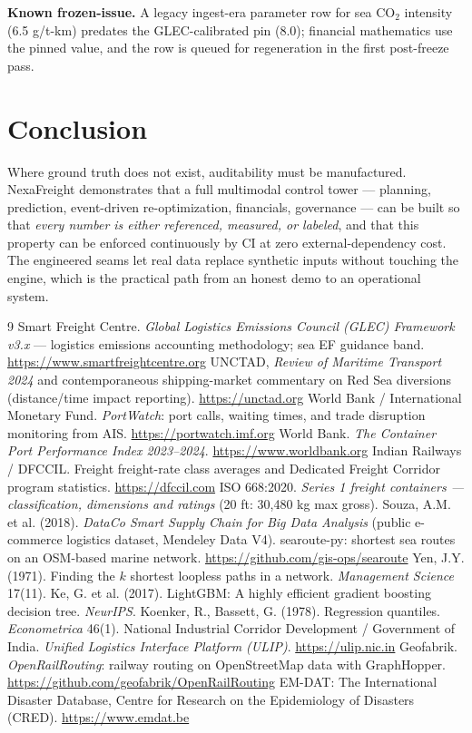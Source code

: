 \documentclass[11pt]{article}
\begin{document}
\textbf{Known frozen-issue.} A legacy ingest-era parameter row for sea
CO$_2$ intensity (6.5 g/t-km) predates the GLEC-calibrated pin (8.0);
financial mathematics use the pinned value, and the row is queued for
regeneration in the first post-freeze pass.

\section{Conclusion}

Where ground truth does not exist, auditability must be manufactured.
NexaFreight demonstrates that a full multimodal control tower ---
planning, prediction, event-driven re-optimization, financials,
governance --- can be built so that \emph{every number is either
referenced, measured, or labeled}, and that this property can be
enforced continuously by CI at zero external-dependency cost. The
engineered seams let real data replace synthetic inputs without
touching the engine, which is the practical path from an honest demo to
an operational system.

\begin{thebibliography}{9}
 Smart Freight Centre. \emph{Global Logistics Emissions
Council (GLEC) Framework v3.x} --- logistics emissions accounting
methodology; sea EF guidance band. \url{https://www.smartfreightcentre.org}
 UNCTAD, \emph{Review of Maritime Transport 2024} and
contemporaneous shipping-market commentary on Red Sea diversions
(distance/time impact reporting). \url{https://unctad.org}
 World Bank / International Monetary Fund.
\emph{PortWatch}: port calls, waiting times, and trade disruption
monitoring from AIS. \url{https://portwatch.imf.org}
 World Bank. \emph{The Container Port Performance Index
2023--2024}. \url{https://www.worldbank.org}
 Indian Railways / DFCCIL. Freight freight-rate class
averages and Dedicated Freight Corridor program statistics.
\url{https://dfccil.com}
 ISO 668:2020. \emph{Series 1 freight containers ---
classification, dimensions and ratings} (20 ft: 30{,}480 kg max gross).
 Souza, A.M. et al. (2018). \emph{DataCo Smart Supply
Chain for Big Data Analysis} (public e-commerce logistics dataset,
Mendeley Data V4).
 searoute-py: shortest sea routes on an OSM-based
marine network. \url{https://github.com/gis-ops/searoute}
 Yen, J.Y. (1971). Finding the $k$ shortest loopless paths
in a network. \emph{Management Science} 17(11).
 Ke, G. et al. (2017). LightGBM: A highly efficient
gradient boosting decision tree. \emph{NeurIPS}.
 Koenker, R., Bassett, G. (1978). Regression
quantiles. \emph{Econometrica} 46(1).
 National Industrial Corridor Development / Government of
India. \emph{Unified Logistics Interface Platform (ULIP)}.
\url{https://ulip.nic.in}
 Geofabrik. \emph{OpenRailRouting}: railway routing on
OpenStreetMap data with GraphHopper.
\url{https://github.com/geofabrik/OpenRailRouting}
 EM-DAT: The International Disaster Database, Centre for
Research on the Epidemiology of Disasters (CRED).
\url{https://www.emdat.be}
\end{thebibliography}
\end{document}
